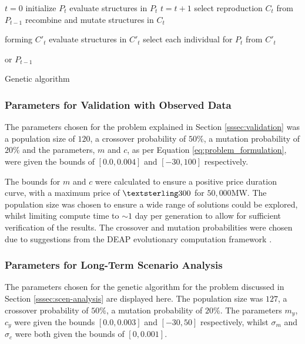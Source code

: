 %
\begin{algorithm}[t]
	\begin{algorithmic}[1]
		\State $t=0$
		\State initialize $P_{t}$
		\State evaluate structures in $P_{t}$
		\State $t=t+1$
		\State select reproduction $C_{t}$ from $P_{t-1}$
		\State recombine and mutate structures in $C_{t}$
		
		forming $C'_{t}$
		\State evaluate structures in $C'_{t}$
		\State select each individual for $P_{t}$ from $C'_{t}$ 
		
		or $P_{t-1}$
		\EndWhile
		\caption{Genetic algorithm \cite{FogelDavidB2009}}
		\label{genetic-algorithm}
	\end{algorithmic}
\end{algorithm}

\subsubsection{Parameters for Validation with Observed Data}
\label{ssec:ga_params_valid}

The parameters chosen for the problem explained in Section \ref{sssec:validation} was a population size of $120$, a crossover probability of $50\%$, a mutation probability of $20\%$ and the parameters, $m$ and $c$, as per Equation \ref{eq:problem_formulation}, were given the bounds of $[0.0, 0.004]$ and $[-30, 100]$ respectively. 

The bounds for $m$ and $c$ were calculated to ensure a positive price duration curve, with a maximum price of $\textsterling300$ for $50,000$MW. The population size was chosen to ensure a wide range of solutions could be explored, whilst limiting compute time to ${\sim}1$ day per generation to allow for sufficient verification of the results. The crossover and mutation probabilities were chosen due to suggestions from the DEAP evolutionary computation framework \cite{Gagn2012}.


\subsubsection{Parameters for Long-Term Scenario Analysis}

The parameters chosen for the genetic algorithm for the problem discussed in Section \ref{sssec:scen-analysis} are displayed here. The population size was $127$, a crossover probability of $50\%$, a mutation probability of $20\%$. The parameters $m_y$, $c_y$ were given the bounds $[0.0, 0.003]$ and $[-30, 50]$ respectively, whilst $\sigma_m$ and $\sigma_c$ were both given the bounds of $[0, 0.001]$.

